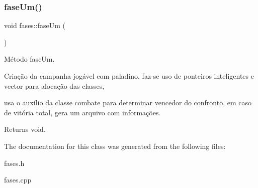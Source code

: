 \subsubsection{\texorpdfstring{fase\+Um()}{faseUm()}}
{\footnotesize\ttfamily void fases\+::fase\+Um (\begin{DoxyParamCaption}{ }\end{DoxyParamCaption})}



Método fase\+Um. 

Criação da campanha jogável com paladino, faz-\/se uso de ponteiros inteligentes e vector para alocação das classes,

usa o auxílio da classe combate para determinar vencedor do confronto, em caso de vitória total, gera um arquivo com informações. \begin{DoxyReturn}{Returns}
void. 
\end{DoxyReturn}


The documentation for this class was generated from the following files\+:\begin{DoxyCompactItemize}
\item 
fases.\+h\item 
fases.\+cpp\end{DoxyCompactItemize}
